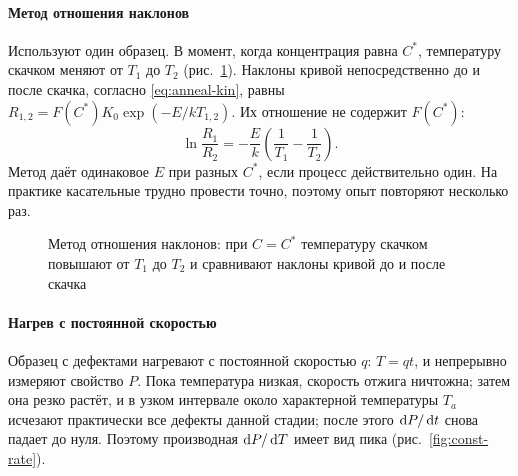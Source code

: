 \paragraph{Метод отношения наклонов}
Используют один образец. В момент, когда концентрация равна $C^*$,
температуру скачком меняют от $T_1$ до $T_2$ (рис.~\ref{fig:slope-ratio}).
Наклоны кривой непосредственно до и после скачка, согласно
\eqref{eq:anneal-kin}, равны $R_{1,2}=F(C^*)K_0\exp(-E/kT_{1,2})$. Их
отношение не содержит $F(C^*)$:
\begin{equation}\label{eq:slope-ratio}
\ln\frac{R_1}{R_2}=-\frac{E}{k}\left(\frac1{T_1}-\frac1{T_2}\right) .
\end{equation}
Метод даёт одинаковое $E$ при разных $C^*$, если процесс действительно
один. На практике касательные трудно провести точно, поэтому опыт
повторяют несколько раз.

\begin{figure}[ht]
\centering
{}
\caption{Метод отношения наклонов: при $C=C^*$ температуру скачком
повышают от $T_1$ до $T_2$ и сравнивают наклоны кривой до и после
скачка}
\label{fig:slope-ratio}
\end{figure}

\paragraph{Нагрев с постоянной скоростью}
Образец с дефектами нагревают с постоянной скоростью $q$: $T=qt$, и
непрерывно измеряют свойство $P$. Пока температура низкая, скорость
отжига ничтожна; затем она резко растёт, и в узком интервале около
характерной температуры $T_a$ исчезают практически все дефекты данной
стадии; после этого $\mathop{}\!\mathrm{d} P/\mathop{}\!\mathrm{d} t$ снова падает до нуля. Поэтому производная
$\mathop{}\!\mathrm{d} P/\mathop{}\!\mathrm{d} T$ имеет вид пика (рис.~\ref{fig:const-rate}).

